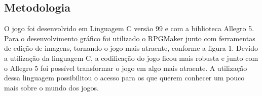 \documentclass{sciposter}
\begin{document}
\begin{multicols}{2}
\newline
\section{Metodologia}

O jogo foi desenvolvido em Linguagem C versão 99 e com a biblioteca Allegro 5. Para o desenvolvimento gráfico foi utilizado o RPGMaker junto com ferramentas de edição de imagens, tornando o jogo mais atraente, conforme a figura 1. Devido a utilização da linguagem C, a codificação do jogo ficou mais robusta e junto com o Allegro 5 foi possível transformar o jogo em algo mais atraente. A utilização dessa linguagem possibilitou o acesso para os que querem conhecer um pouco mais sobre o mundo dos jogos.
\newline


\end{multicols}
\end{document}
